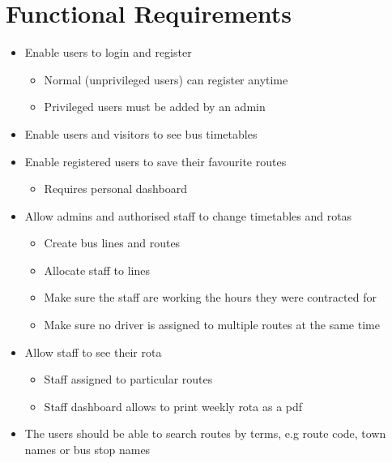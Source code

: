 \clearpage
\section{Functional Requirements}

\begin{itemize}
  \item Enable users to login and register
    \begin{itemize}
      \item Normal (unprivileged users) can register anytime
      \item Privileged users must be added by an admin
    \end{itemize}
  \item Enable users and visitors to see bus timetables
  \item Enable registered users to save their favourite routes
    \begin{itemize}
      \item Requires personal dashboard
    \end{itemize}
  \item Allow admins and authorised staff to change timetables and rotas
    \begin{itemize}
      \item Create bus lines and routes
      \item Allocate staff to lines
      \item Make sure the staff are working the hours they were contracted for
      \item Make sure no driver is assigned to multiple routes at the same time
    \end{itemize}
  \item Allow staff to see their rota
    \begin{itemize}
      \item Staff assigned to particular routes
      \item Staff dashboard allows to print weekly rota as a pdf
    \end{itemize}
  \item The users should be able to search routes by terms, e.g route code, town names or bus stop names
\end{itemize}
